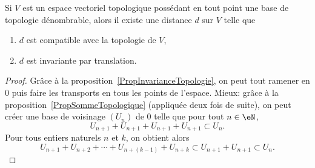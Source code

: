 \begin{theorem}      \label{THOooAGBXooZnvQLK}
    Si $V$ est un espace vectoriel topologique possédant en tout point une base de topologie dénombrable, alors il existe une distance \( d\) sur \( V\) telle que
    \begin{enumerate}
        \item
            \( d\) est compatible avec la topologie de \( V\),
        \item
            \( d\) est invariante par translation.
    \end{enumerate}
\end{theorem}

\begin{proof}
Grâce à la proposition~\ref{PropInvarianceTopologie}, on peut tout ramener en \(0 \) puis faire les transports en tous les points de l'espace. Mieux: grâce à la proposition~\ref{PropSommeTopologique} (appliquée deux fois de suite), on peut créer une base de voisinage \( (U_n) \) de \( 0 \) telle que pour tout \(n \in \eN\),
\begin{equation}\label{EqBaseTopoMetriquePf1}
  U_{n+1} + U_{n+1} + U_{n+1} + U_{n+1} \subset U_n.
\end{equation}
Pour tous entiers naturels \(n\) et \(k\), on obtient alors
\begin{equation}\label{EqBaseTopoMetriquePf2}
  U_{n+1} + U_{n+2} + \cdots  + U_{n+(k-1)} + U_{n+k} \subset  U_{n+1} + U_{n+1} \subset U_n.
\end{equation}


\end{proof}
